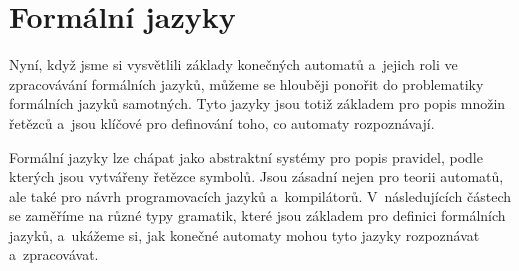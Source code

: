 \section{Formální jazyky}\label{sec:jazyky}

Nyní, když jsme si vysvětlili základy konečných automatů a~jejich roli ve zpracovávání formálních jazyků, můžeme se hlouběji ponořit do problematiky formálních jazyků samotných. Tyto jazyky jsou totiž základem pro popis množin řetězců a~jsou klíčové pro definování toho, co automaty rozpoznávají.

Formální jazyky lze chápat jako abstraktní systémy pro popis pravidel, podle kterých jsou vytvářeny řetězce symbolů. Jsou zásadní nejen pro teorii automatů, ale také pro návrh programovacích jazyků a~kompilátorů. V~následujících částech se zaměříme na různé typy gramatik, které jsou základem pro definici formálních jazyků, a~ukážeme si, jak konečné automaty mohou tyto jazyky rozpoznávat a~zpracovávat.